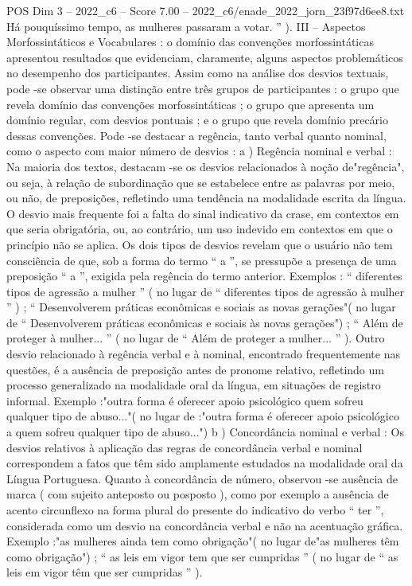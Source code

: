 \begin{textsample}{POS Dim 3 – 2022\_c6 – Score 7.00 – 2022\_c6/enade\_2022\_jorn\_23f97d6ee8.txt}
Há pouquíssimo tempo, as mulheres passaram a votar. ” ).
III – Aspectos Morfossintáticos e Vocabulares : o domínio das convenções morfossintáticas apresentou resultados que evidenciam, claramente, alguns aspectos problemáticos no desempenho dos participantes.
Assim como na análise dos desvios textuais, pode -se observar uma distinção entre três grupos de participantes : o grupo que revela domínio das convenções morfossintáticas ; o grupo que apresenta um domínio regular, com desvios pontuais ; e o grupo que revela domínio precário dessas convenções.
Pode -se destacar a regência, tanto verbal quanto nominal, como o aspecto com maior número de desvios : a ) Regência nominal e verbal : Na maioria dos textos, destacam -se os desvios relacionados à noção de"regência", ou seja, à relação de subordinação que se estabelece entre as palavras por meio, ou não, de preposições, refletindo uma tendência na modalidade escrita da língua.
O desvio mais frequente foi a falta do sinal indicativo da crase, em contextos em que seria obrigatória, ou, ao contrário, um uso indevido em contextos em que o princípio não se aplica.
Os dois tipos de desvios revelam que o usuário não tem consciência de que, sob a forma do termo “ a ”, se pressupõe a presença de uma preposição “ a ”, exigida pela regência do termo anterior.
Exemplos : “ diferentes tipos de agressão a mulher ” ( no lugar de “ diferentes tipos de agressão à mulher ” ) ; “ Desenvolverem práticas econômicas e sociais as novas gerações"( no lugar de “ Desenvolverem práticas econômicas e sociais às novas gerações") ; “ Além de proteger à mulher... ” ( no lugar de “ Além de proteger a mulher... ” ).
Outro desvio relacionado à regência verbal e à nominal, encontrado frequentemente nas questões, é a ausência de preposição antes de pronome relativo, refletindo um processo generalizado na modalidade oral da língua, em situações de registro informal.
Exemplo :"outra forma é oferecer apoio psicológico quem sofreu qualquer tipo de abuso..."( no lugar de :"outra forma é oferecer apoio psicológico a quem sofreu qualquer tipo de abuso...") b ) Concordância nominal e verbal : Os desvios relativos à aplicação das regras de concordância verbal e nominal correspondem a fatos que têm sido amplamente estudados na modalidade oral da Língua Portuguesa.
Quanto à concordância de número, observou -se ausência de marca ( com sujeito anteposto ou posposto ), como por exemplo a ausência de acento circunflexo na forma plural do presente do indicativo do verbo “ ter ”, considerada como um desvio na concordância verbal e não na acentuação gráfica.
Exemplo :"as mulheres ainda tem como obrigação"( no lugar de"as mulheres têm como obrigação") ; “ as leis em vigor tem que ser cumpridas ” ( no lugar de “ as leis em vigor têm que ser cumpridas ” ).

\end{textsample}
